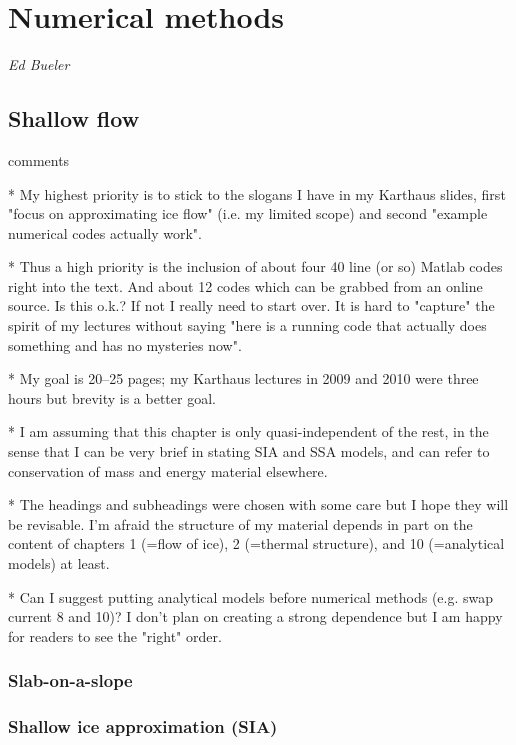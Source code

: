  

\chapter{Numerical methods}
{\it\Large{Ed Bueler}}
\vspace*{0.3in}
\section{Shallow flow}

comments 


  * My highest priority is to stick to the slogans I have in my Karthaus slides,
    first "focus on approximating ice flow" (i.e. my limited scope) and
    second "example numerical codes actually work".
    
  * Thus a high priority is the inclusion of about four 40 line (or so) Matlab
    codes right into the text.  And about 12 codes which can be grabbed from
    an online source.  Is this o.k.?  If not I really need to start over.
    It is hard to "capture" the spirit of my lectures without saying "here is
    a running code that actually does something and has no mysteries now".
  
  * My goal is 20--25 pages; my Karthaus lectures in 2009 and 2010 were three
    hours but brevity is a better goal.

  * I am assuming that this chapter is only quasi-independent of the rest,
    in the sense that I can be very brief in stating SIA and SSA models, and 
    can refer to conservation of mass and energy material elsewhere.

  * The headings and subheadings were chosen with some care but I hope they
    will be revisable.  I'm afraid the structure of my material depends in
    part on the content of chapters 1 (=flow of ice), 2 (=thermal structure),
    and 10 (=analytical models) at least.

  * Can I suggest putting analytical models before numerical methods (e.g.
    swap current 8 and 10)?  I don't plan on creating a strong dependence
    but I am happy for readers to see the "right" order.

\subsection{ Slab-on-a-slope}
\subsection{ Shallow ice approximation (SIA)}
